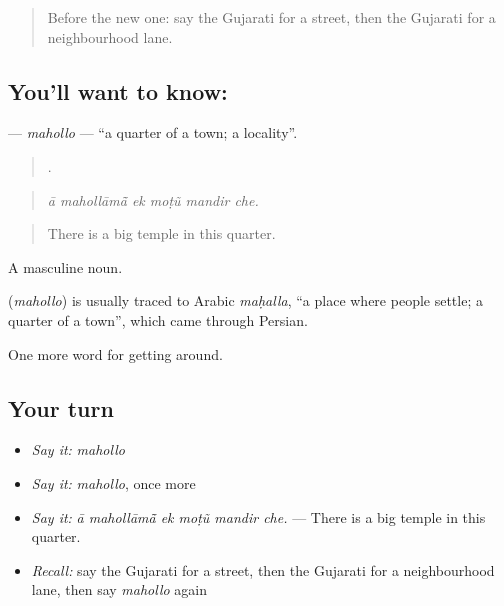 \label{lesson:GU-C419-mahollo}



\begin{quote}
Before the new one: say the Gujarati for a street, then the Gujarati for a neighbourhood lane.
\end{quote}

\subsection*{You'll want to know: }
\textbf{} — \emph{mahollo} — \textquotedblleft{}a quarter of a town; a locality\textquotedblright{}.

\begin{quote}
     .
\end{quote}

\begin{quote}
\emph{ā mahollāmā̃ ek moṭũ mandir che.}
\end{quote}

\begin{quote}
There is a big temple in this quarter.
\end{quote}

A masculine noun.

\begin{cousinweb}
\textbf{} (\emph{mahollo}) is usually traced to Arabic \emph{maḥalla}, \textquotedblleft{}a place where people settle; a quarter of a town\textquotedblright{}, which came through Persian.
\end{cousinweb}

\begin{grammarlens}[title={What you've built}]
One more word for getting around.
\end{grammarlens}

\subsection*{Your turn}
\begin{itemize}
\raggedright
  \item \emph{Say it:} \emph{mahollo}
  \item \emph{Say it:} \emph{mahollo}, once more
  \item \emph{Say it:} \emph{ā mahollāmā̃ ek moṭũ mandir che.} — There is a big temple in this quarter.
  \item \emph{Recall:} say the Gujarati for a street, then the Gujarati for a neighbourhood lane, then say \emph{mahollo} again
\end{itemize}

